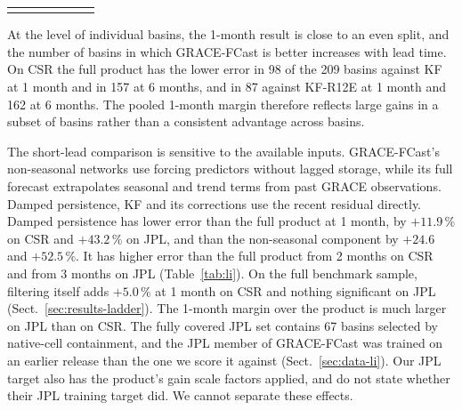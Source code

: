 \documentclass[hess, manuscript]{copernicus}
\begin{document}
\begin{table}[!htbp]
\begin{tabular}{lcccccc}
\bottomhline
\end{tabular}
\end{table}

At the level of individual basins, the 1-month result is close to an even split, and the number of basins in which GRACE-FCast is better increases with lead time. On CSR the full product has the lower
error in
98 of the 209 basins against KF at 1 month and in 157 at 6 months, and in
87 against KF-R12E at 1 month and 162 at 6 months. The pooled 1-month
margin therefore reflects large gains in a subset of basins rather than a consistent advantage across basins.

The short-lead comparison is sensitive to the available inputs.
GRACE-FCast's non-seasonal networks use forcing predictors without lagged
storage, while its full forecast extrapolates seasonal and trend terms
from past GRACE observations. Damped persistence, KF and its corrections
use the recent residual directly. Damped persistence
has lower error than the full product at 1 month, by
$+11.9\,\%$ on CSR and
$+43.2\,\%$ on JPL, and than the non-seasonal component by
$+24.6$ and $+52.5\,\%$. It has higher error than the full product from
2 months on CSR and from 3 months on JPL (Table~\ref{tab:li}). On the
full benchmark sample, filtering itself adds $+5.0\,\%$ at 1 month on CSR
and nothing significant on JPL (Sect.~\ref{sec:results-ladder}). The 1-month
margin over the product is much larger on JPL than on CSR. The fully
covered JPL set contains 67 basins selected by native-cell containment, and the
JPL member of GRACE-FCast was trained on an earlier release than the one
we score it against (Sect.~\ref{sec:data-li}). Our JPL target also has the
product's gain scale factors applied, and \citet{li2026fcast} do not state
whether their JPL training target did. We cannot separate these effects.
\end{document}
